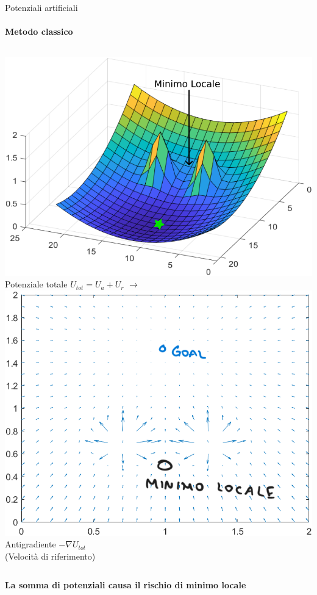 \documentclass[handout]{beamer}
\begin{document}
\begin{frame}{Potenziali artificiali}
\framesubtitle{Metodo classico}

\vspace{5mm}
\begin{columns}
\centering
\includegraphics[width=\textwidth]{minimolocale_ink.png} \\
Potenziale totale \(U_{tot} = U_a + U_r\)
\centering
$\rightarrow$
\centering
\includegraphics[width=\textwidth]{antigradMinimoLocale.png} \\
Antigradiente $-\nabla U_{tot}$ \\
(Velocità di riferimento)
\end{columns}

\vspace{10mm}

\centering
\begin{tcolorbox}[colframe=red!50!white , center upper]
\textbf{La somma di potenziali causa il rischio di minimo locale}
\end{tcolorbox}
\end{frame}
\end{document}

